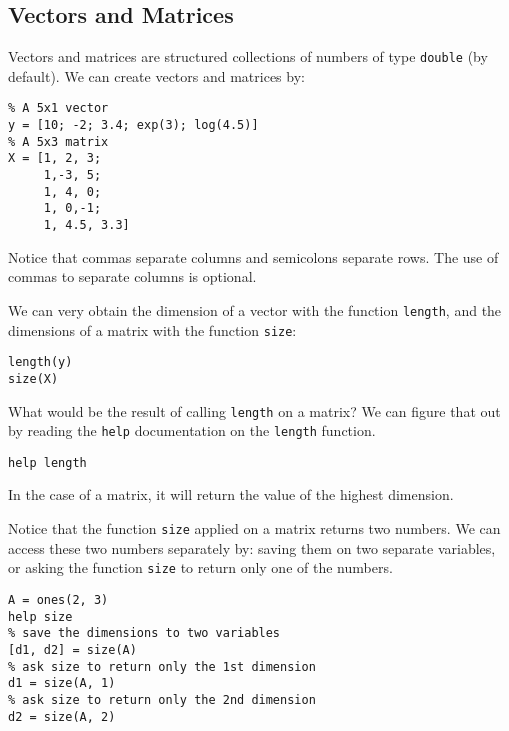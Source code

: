 \documentclass[12pt, a4paper]{article}
\begin{document}
\subsection{Vectors and Matrices}
\label{sec:org5e54f2a}
Vectors and matrices are structured collections of numbers of type \texttt{double} (by default).
We can create vectors and matrices by:
\lstset{language=matlab,label= ,caption= ,captionpos=b,firstnumber=1,numbers=left,style=Matlab-editor}
\begin{lstlisting}
% A 5x1 vector
y = [10; -2; 3.4; exp(3); log(4.5)]
% A 5x3 matrix
X = [1, 2, 3;
     1,-3, 5;
     1, 4, 0;
     1, 0,-1;
     1, 4.5, 3.3]
\end{lstlisting}
Notice that commas separate columns and semicolons separate rows.
The use of commas to separate columns is optional.

We can very obtain the dimension of a vector with the function \texttt{length}, and the dimensions of a matrix with the function \texttt{size}:
\lstset{language=matlab,label= ,caption= ,captionpos=b,firstnumber=1,numbers=left,style=Matlab-editor}
\begin{lstlisting}
length(y)
size(X)
\end{lstlisting}
What would be the result of calling \texttt{length} on a matrix?
We can figure that out by reading the \texttt{help} documentation on the \texttt{length} function.
\lstset{language=matlab,label= ,caption= ,captionpos=b,firstnumber=1,numbers=left,style=Matlab-editor}
\begin{lstlisting}
help length
\end{lstlisting}
In the case of a matrix, it will return the value of the highest dimension.

Notice that the function \texttt{size} applied on a matrix returns two numbers.
We can access these two numbers separately by: saving them on two separate variables, or asking the function \texttt{size} to return only one of the numbers.
\lstset{language=matlab,label= ,caption= ,captionpos=b,firstnumber=1,numbers=left,style=Matlab-editor}
\begin{lstlisting}
A = ones(2, 3)
help size
% save the dimensions to two variables
[d1, d2] = size(A)
% ask size to return only the 1st dimension
d1 = size(A, 1)
% ask size to return only the 2nd dimension
d2 = size(A, 2)
\end{lstlisting}
\end{document}
